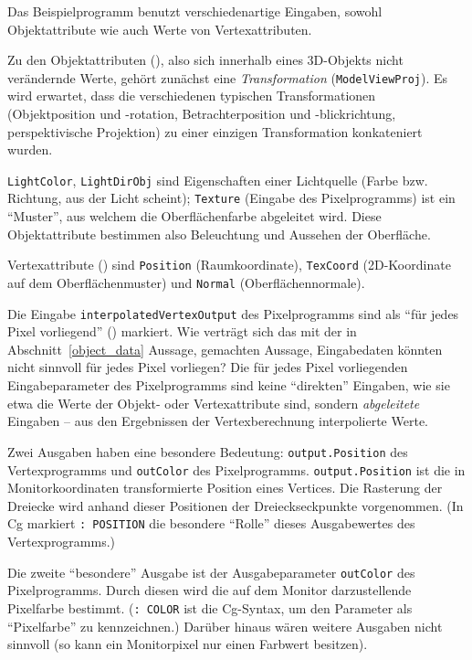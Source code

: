 \documentclass[twoside,a4paper,fleqn,12pt]{book}
\begin{document}
Das Beispielprogramm benutzt verschiedenartige Eingaben, sowohl Objektattribute wie auch Werte von Vertexattributen.

Zu den Objektattributen (), also sich innerhalb eines 3D-Objekts nicht verändernde Werte,
gehört zunächst eine \emph{Transformation} (\verb+ModelViewProj+). Es wird erwartet, dass die verschiedenen typischen Transformationen
(Objektposition und -rotation, Betrachterposition und -blickrichtung, perspektivische Projektion) zu einer einzigen Transformation konkateniert wurden.

\verb+LightColor+, \verb+LightDirObj+ sind Eigenschaften einer Lichtquelle (Farbe bzw. Richtung, aus der Licht scheint);
\verb+Texture+ (Eingabe des Pixelprogramms) ist ein "`Muster"', aus welchem die Oberflächenfarbe abgeleitet wird.
Diese Objektattribute bestimmen also Beleuchtung und Aussehen der Oberfläche.


Vertexattribute () sind \verb+Position+ (Raumkoordinate), \verb+TexCoord+ (2D-Koordinate auf dem Oberflächenmuster)
und \verb+Normal+ (Oberflächennormale).

Die Eingabe \verb+interpolatedVertexOutput+ des Pixelprogramms sind als "`für jedes Pixel vorliegend"' () markiert.
Wie verträgt sich das mit der in Abschnitt~\ref{object_data} Aussage, gemachten Aussage, Eingabedaten könnten nicht sinnvoll für jedes
Pixel vorliegen? Die für jedes Pixel vorliegenden Eingabeparameter des Pixelprogramms sind keine "`direkten"' Eingaben,
wie sie etwa die Werte der Objekt- oder Vertexattribute sind, sondern \emph{abgeleitete} Eingaben --
aus den Ergebnissen der Vertexberechnung interpolierte Werte.

Zwei Ausgaben haben eine besondere Bedeutung: \verb+output.Position+ des Vertexprogramms und \verb+outColor+ des Pixelprogramms.
\verb+output.Position+ ist die in Monitorkoordinaten transformierte Position eines Vertices. Die Rasterung der Dreiecke wird anhand dieser
Positionen der Dreieckseckpunkte vorgenommen. (In Cg markiert \verb+: POSITION+ die besondere "`Rolle"' dieses Ausgabewertes des Vertexprogramms.)

Die zweite "`besondere"' Ausgabe ist der Ausgabeparameter \verb+outColor+ des Pixelprogramms. Durch diesen wird die auf dem Monitor
darzustellende Pixelfarbe bestimmt. (\verb+: COLOR+ ist die Cg-Syntax, um den Parameter als "`Pixelfarbe"' zu kennzeichnen.)
Darüber hinaus wären weitere Ausgaben nicht sinnvoll (so kann ein Monitorpixel nur einen Farbwert besitzen).
\end{document}
